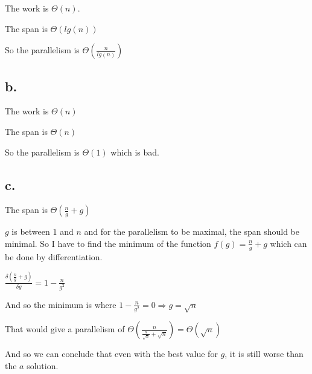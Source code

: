 \documentclass[12pt,a4paper]{report}
\begin{document}
The work is $\Theta(n)$.

The span is $\Theta(lg(n))$

So the parallelism is $\Theta(\frac{n}{lg(n)})$

\subsection*{b.}
The work is $\Theta(n)$

The span is $\Theta(n)$

So the parallelism is $\Theta(1)$ which is bad.

\subsection*{c.}
The span is $\Theta(\frac{n}{g} + g)$

$g$ is between $1$ and $n$ and for the parallelism to be maximal, the span should be minimal. So I have to find the minimum of the function $f(g) = \frac{n}{g} + g$
which can be done by differentiation.

$\frac{\delta (\frac{n}{g} +g)}{\delta g} = 1 - \frac{n}{g^2}$

And so the minimum is where  $1 - \frac{n}{g^2} = 0 \Rightarrow g = \sqrt{n}$

That would give a parallelism of $\Theta(\frac{n}{\frac{n}{\sqrt{n}} +\sqrt{n}}) =  \Theta(\sqrt{n})$

And so we can conclude that even with the best value for $g$, it is still worse than the $a$ solution.
\end{document}
